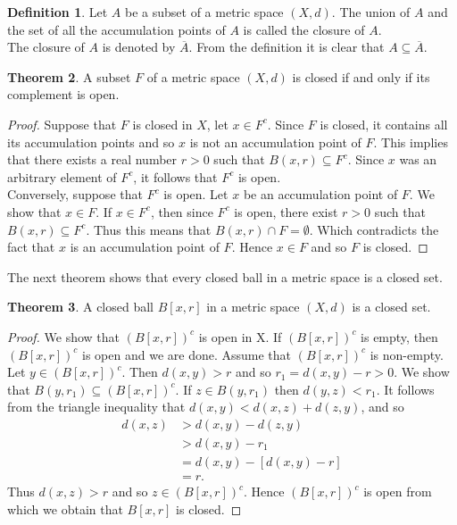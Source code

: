 \documentclass[11pt,a4paper]{article}
\theoremstyle{definition}
\newtheorem{thm}{Theorem}[subsection]
\newtheorem{defn}[thm]{Definition}
\begin{document}
\begin{defn}
Let $A$ be a subset of a metric space $(X,d)$. The union of $A$ and the set of all the accumulation points of $A$ is called the closure of $A$.\\

The closure of $A$ is denoted by $\overline{A}$. From the definition it is clear that $A\subseteq \overline{A}$.
\end{defn}

\begin{thm}
A subset $F$ of a metric space $(X,d)$ is closed if and only if its complement is open.
\end{thm}


\begin{proof}
Suppose that $F$ is closed in $X$, let $x\in F^c$. Since $F$ is closed, it contains all its accumulation points and so $x$ is not an accumulation point of $F$. This implies that there exists a real number $r>0$ such that $B(x,r)\subseteq F^c$. Since $x$ was an arbitrary element of $F^c$, it follows that $F^c$ is open.\\ 
Conversely, suppose that $F^c$ is open. Let $x$ be an accumulation point of $F$. We show that $x\in F$. If $x\in F^c$, then since $F^c$ is open, there exist $r>0$ such that $B(x,r)\subseteq F^c$. Thus this means that $B(x,r)\cap F=\emptyset$. Which contradicts the fact that $x$ is an accumulation point of $F$. Hence $x\in F$ and so $F$ is closed.
\end{proof}

The next theorem shows that every closed ball in a metric space is a closed set.


\begin{thm}
A closed ball $B[x,r]$ in a metric space $(X,d)$ is a closed set.
\end{thm}

\begin{proof}
We show that $(B[x,r])^c$ is open in X. If $(B[x,r])^c$ is empty, then $(B[x,r])^c$ is open and we are done. Assume that $(B[x,r])^c$ is non-empty. Let $y\in (B[x,r])^c$. Then $d(x,y)>r$ and so $r_1=d(x,y)-r>0$. We show that $B(y,r_1)\subseteq (B[x,r])^c$. If $z\in B(y,r_1)$ then $d(y,z)<r_1$. It follows from the triangle inequality that $d(x,y)<d(x,z)+d(z,y)$, and so
\begin{align*}
d(x,z)&>d(x,y)-d(z,y)\\
      &>d(x,y)-r_1\\
      &=d(x,y)-[d(x,y)-r]\\
      &=r.
\end{align*}
Thus $d(x,z)>r$ and so $z\in (B[x,r])^c$. Hence $(B[x,r])^c$ is open from which we obtain that $B[x,r]$ is closed.
\end{proof}
\end{document}
